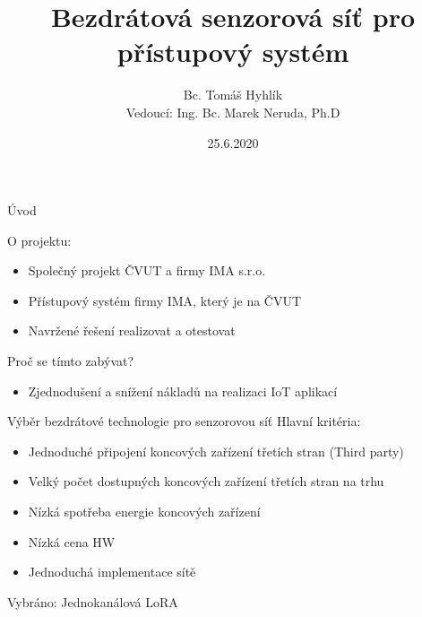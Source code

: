 \documentclass{beamer}
\title{Bezdrátová senzorová síť pro přístupový systém}
\date{25.6.2020}
\author{Bc. Tomáš Hyhlík \\
Vedoucí: Ing. Bc. Marek Neruda, Ph.D}
\institute{Katedra Mikroelektroniky}
\begin{document}
	\maketitle
  

\begin{frame}{Úvod}

	O projektu:
	\begin{itemize}
		\item Společný projekt ČVUT a firmy IMA s.r.o. 
		\item Přístupový systém firmy IMA, který je na ČVUT
		\item Navržené řešení realizovat a otestovat
	\end{itemize}

	Proč se tímto zabývat?
	\begin{itemize}
		\item Zjednodušení a snížení nákladů na realizaci IoT aplikací
	\end{itemize}

\end{frame}


\begin{frame}{Výběr bezdrátové technologie pro senzorovou síť}
	Hlavní kritéria:
	\begin{itemize}
		\item Jednoduché připojení koncových zařízení třetích stran (Third party)
		\item Velký počet dostupných koncových zařízení třetích stran na trhu 
		\item Nízká spotřeba energie koncových zařízení
		\item Nízká cena HW
		\item Jednoduchá implementace sítě
	\end{itemize}

	Vybráno: Jednokanálová LoRA

\end{frame}
\end{document}

